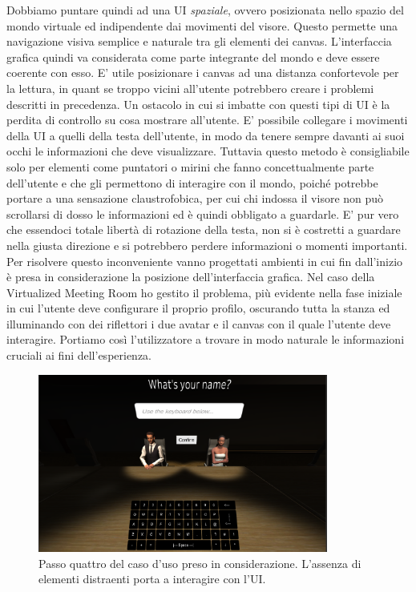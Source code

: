 Dobbiamo puntare quindi ad una UI \textit{spaziale}, ovvero posizionata nello spazio del mondo virtuale ed indipendente dai movimenti del visore. Questo permette una navigazione visiva semplice e naturale tra gli elementi dei canvas. L'interfaccia grafica quindi va considerata come parte integrante del mondo e deve essere coerente con esso. E' utile posizionare i canvas ad una distanza confortevole per la lettura, in quant se troppo vicini all'utente potrebbero creare i problemi descritti in precedenza. Un ostacolo in cui si imbatte con questi tipi di UI è la perdita di controllo su cosa mostrare all'utente. E' possibile collegare i movimenti della UI a quelli della testa dell'utente, in modo da tenere sempre davanti ai suoi occhi le informazioni che deve visualizzare. Tuttavia questo metodo è consigliabile solo per elementi come puntatori o mirini che fanno concettualmente parte dell'utente e che gli permettono di interagire con il mondo, poiché potrebbe portare a una sensazione claustrofobica, per cui chi indossa il visore non può scrollarsi di dosso le informazioni ed è quindi obbligato a guardarle. E' pur vero che essendoci totale libertà di rotazione della testa, non si è costretti a guardare nella giusta direzione e si potrebbero perdere informazioni o momenti importanti. Per risolvere questo inconveniente vanno progettati ambienti in cui fin dall'inizio è presa in considerazione la posizione dell'interfaccia grafica. Nel caso della Virtualized Meeting Room ho gestito il problema, più evidente nella fase iniziale in cui l'utente deve configurare il proprio profilo, oscurando tutta la stanza ed illuminando con dei riflettori i due avatar e il canvas con il quale l'utente deve interagire. Portiamo così l'utilizzatore a trovare in modo naturale le informazioni cruciali ai fini dell'esperienza. 
\begin{figure}[H]
	\includegraphics[width=0.85\textwidth]{figure/UIKeyboard}
	\centering
	\vspace{0.3cm}
	\caption{Passo quattro del caso d'uso preso in considerazione. L'assenza di elementi distraenti porta a interagire con l'UI.}
\end{figure}

